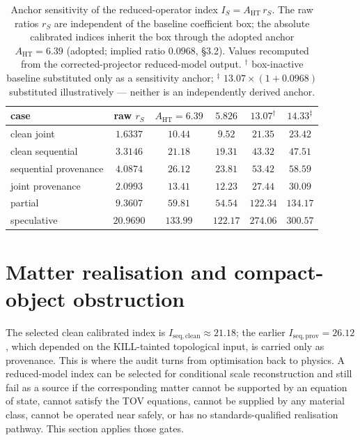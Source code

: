 \documentclass[11pt,a4paper]{article}
\begin{document}
\begin{table}[ht]
\centering
\caption{Anchor sensitivity of the reduced-operator index $I_{S}=A_{\mathrm{HT}}\,r_{S}$. The raw ratios $r_{S}$ are independent of the baseline coefficient box; the absolute calibrated indices inherit the box through the adopted anchor $A_{\mathrm{HT}}=6.39$ (adopted; implied ratio $0.0968$, \S3.2). Values recomputed from the corrected-projector reduced-model output. $^{\dagger}$ box-inactive baseline substituted only as a sensitivity anchor; $^{\ddagger}$ $13.07\times(1+0.0968)$ substituted illustratively --- neither is an independently derived anchor.}
\label{tab:anchor}
\begin{tabular}{lccccc}
\toprule
case & raw $r_{S}$ & $A_{\mathrm{HT}}=6.39$ & $5.826$ & $13.07^{\dagger}$ & $14.33^{\ddagger}$ \\
\midrule
clean joint            & $1.6337$  & $10.44$  & $9.52$   & $21.35$  & $23.42$ \\
clean sequential       & $3.3146$  & $21.18$  & $19.31$  & $43.32$  & $47.51$ \\
sequential provenance  & $4.0874$  & $26.12$  & $23.81$  & $53.42$  & $58.59$ \\
joint provenance       & $2.0993$  & $13.41$  & $12.23$  & $27.44$  & $30.09$ \\
partial                & $9.3607$  & $59.81$  & $54.54$  & $122.34$ & $134.17$ \\
speculative            & $20.9690$ & $133.99$ & $122.17$ & $274.06$ & $300.57$ \\
\bottomrule
\end{tabular}
\end{table}

\section{Matter realisation and compact-object obstruction}\label{sec:matter}

The selected clean calibrated index is $I_{\mathrm{seq,clean}}\approx21.18$; the earlier $I_{\mathrm{seq,prov}}=26.12$, which depended on the KILL-tainted topological input, is carried only as provenance. This is where the audit turns from optimisation back to physics. A reduced-model index can be selected for conditional scale reconstruction and still fail as a source if the corresponding matter cannot be supported by an equation of state, cannot satisfy the TOV equations, cannot be supplied by any material class, cannot be operated near safely, or has no standards-qualified realisation pathway. This section applies those gates.
\end{document}
